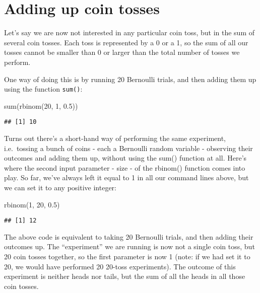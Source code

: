 \documentclass[
]{book}
\newenvironment{Shaded}{\begin{snugshade}}{\end{snugshade}}
\newcommand{\DecValTok}[1]{\textcolor[rgb]{0.00,0.00,0.81}{#1}}
\newcommand{\FloatTok}[1]{\textcolor[rgb]{0.00,0.00,0.81}{#1}}
\newcommand{\FunctionTok}[1]{\textcolor[rgb]{0.00,0.00,0.00}{#1}}
\newcommand{\NormalTok}[1]{#1}
\begin{document}
\hypertarget{adding-up-coin-tosses}{%
\section{Adding up coin tosses}\label{adding-up-coin-tosses}}

Let's say we are now not interested in any particular coin toss, but in the sum of several coin tosses. Each toss is represented by a 0 or a 1, so the sum of all our tosses cannot be smaller than 0 or larger than the total number of tosses we perform.

One way of doing this is by running 20 Bernoulli trials, and then adding them up using the function \texttt{sum()}:

\begin{Shaded}
\begin{Highlighting}[]
\FunctionTok{sum}\NormalTok{(}\FunctionTok{rbinom}\NormalTok{(}\DecValTok{20}\NormalTok{, }\DecValTok{1}\NormalTok{, }\FloatTok{0.5}\NormalTok{))}
\end{Highlighting}
\end{Shaded}

\begin{verbatim}
## [1] 10
\end{verbatim}

Turns out there's a short-hand way of performing the same experiment, i.e.~tossing a bunch of coins - each a Bernoulli random variable - observing their outcomes and adding them up, without using the sum() function at all. Here's where the second input parameter - size - of the rbinom() function comes into play. So far, we've always left it equal to 1 in all our command lines above, but we can set it to any positive integer:

\begin{Shaded}
\begin{Highlighting}[]
\FunctionTok{rbinom}\NormalTok{(}\DecValTok{1}\NormalTok{, }\DecValTok{20}\NormalTok{, }\FloatTok{0.5}\NormalTok{)}
\end{Highlighting}
\end{Shaded}

\begin{verbatim}
## [1] 12
\end{verbatim}

The above code is equivalent to taking 20 Bernoulli trials, and then adding their outcomes up. The ``experiment'' we are running is now not a single coin toss, but 20 coin tosses together, so the first parameter is now 1 (note: if we had set it to 20, we would have performed 20 20-toss experiments). The outcome of this experiment is neither heads nor tails, but the sum of all the heads in all those coin tosses.
\end{document}
